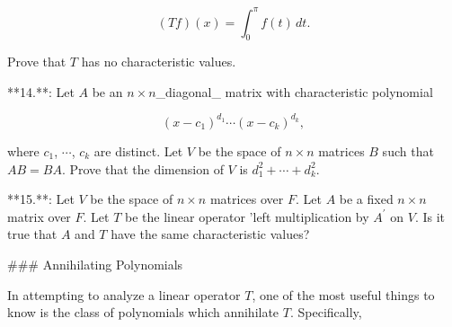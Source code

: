 \[(T\!f)(x)=\int_{0}^{\pi}f(t)\,dt.\]

Prove that \(T\) has no characteristic values.

**14.**: Let \(A\) be an \(n\times n\)_diagonal_ matrix with characteristic polynomial

\[(x-c_{1})^{d_{1}}\cdots(x-c_{k})^{d_{k}},\]

where \(c_{1}\), \(\cdots\), \(c_{k}\) are distinct. Let \(V\) be the space of \(n\times n\) matrices \(B\) such that \(AB=BA\). Prove that the dimension of \(V\) is \(d_{1}^{2}+\cdots+d_{k}^{2}\).

**15.**: Let \(V\) be the space of \(n\times n\) matrices over \(F\). Let \(A\) be a fixed \(n\times n\) matrix over \(F\). Let \(T\) be the linear operator 'left multiplication by \(A^{\prime}\) on \(V\). Is it true that \(A\) and \(T\) have the same characteristic values?

### Annihilating Polynomials

In attempting to analyze a linear operator \(T\), one of the most useful things to know is the class of polynomials which annihilate \(T\). Specifically,